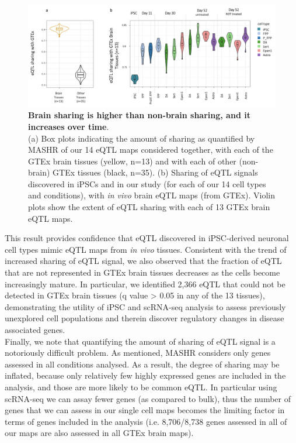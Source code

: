 \begin{figure}[h]
\centering
\includegraphics[width=16cm]{Chapter5/Fig/neuroseq_mashr.png}
\caption[GTEx sharing]{\textbf{Brain sharing is higher than non-brain sharing, and it increases over time}.\\
(a) Box plots indicating the amount of sharing as quantified by MASHR \cite{urbut2019flexible} of our 14 eQTL maps considered together, with each of the GTEx brain tissues (yellow, n=13) and with each of other (non-brain) GTEx tissues (black, n=35).
(b) Sharing of eQTL signals discovered in iPSCs and in our study (for each of our 14 cell types and conditions), 
with \textit{in vivo} brain eQTL maps (from GTEx). 
Violin plots show the extent of eQTL sharing with each of 13 GTEx brain eQTL maps.
}
\label{fig:neuroseq_and_gtex_brain_sharing}
\end{figure}

This result provides confidence that eQTL discovered in iPSC-derived neuronal cell types mimic eQTL maps from \textit{in vivo} tissues. 
Consistent with the trend of increased sharing of eQTL signal, we also observed that the fraction of eQTL that are not represented in GTEx brain tissues decreases as the cells become increasingly mature. 
In particular, we identified 2,366 eQTL that could not be detected in GTEx brain tissues (q value > 0.05 in any of the 13 tissues), demonstrating the utility of iPSC and scRNA-seq analysis to assess previously unexplored cell populations and therein discover regulatory changes in disease associated genes. \\

Finally, we note that quantifying the amount of sharing of eQTL signal is a notoriously difficult problem.
As mentioned, MASHR considers only genes assessed in all conditions analysed. 
As a result, the degree of sharing may be inflated, because only relatively few highly expressed genes are included in the analysis, and those are more likely to be common eQTL. 
In particular using scRNA-seq we can assay fewer genes (as compared to bulk), thus the number of genes that we can assess in our single cell maps becomes the limiting factor in terms of genes included in the analysis (i.e. 8,706/8,738 genes assessed in all of our maps are also assessed in all GTEx brain maps).\\

